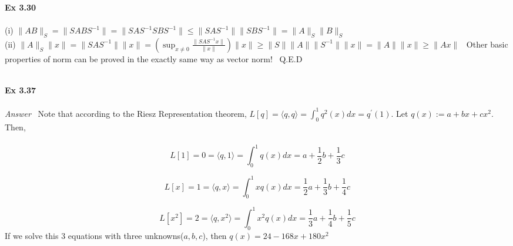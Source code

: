 \documentclass[letterpaper,12pt]{article}
\theoremstyle{definition}
\begin{document}
\begin{spacing}{1.3}{}
	\setlength{\leftskip}{10pt}
	
	\textbf{Ex 3.30} \\\\
	(i) $\|AB\|_S = \|SABS^{-1}\| = \|SAS^{-1} SBS^{-1}\| \leq \|SAS^{-1}\| \|SBS^{-1}\| = \|A\|_S \|B\|_S  $ \\
	(ii) $\|A\|_{S} \|x\| = \|SAS^{-1}\| \|x\| = (\sup_{x \neq 0} \frac{\|SAS^{-1} x\|}{\|x\|}) \|x\| \geq \|S\| \|A\| \|S^{-1}\| \|x\| = \|A\| \|x\| \geq \|Ax\| $ \ Other basic properties of norm can be proved in the exactly same way as vector norm! \ Q.E.D \\\\
	
	
	\setlength{\leftskip}{10pt}
	
	\textbf{Ex 3.37} \\\\
	\emph{Answer} \ Note that according to the Riesz Representation theorem, $L[q] = \langle q,q \rangle = \int_{0}^{1} q^{2}(x)dx = q^{'}(1)$. Let $q(x) := a + bx + c x^2$. Then, \\\\
	\[L[1] = 0 =\langle q,1 \rangle = \int_{0}^{1} q(x)dx = a + \frac{1}{2}b + \frac{1}{3}c \]
	
	\[L[x] = 1 =\langle q,x \rangle = \int_{0}^{1} xq(x)dx = \frac{1}{2}a + \frac{1}{3}b + \frac{1}{4}c \]
	
	\[L[x^2] = 2 =\langle q,x^2 \rangle = \int_{0}^{1} x^2 q(x)dx = \frac{1}{3} a + \frac{1}{4}b + \frac{1}{5}c \]
	If we solve this 3 equations with three unknowns($a,b,c$), then
	$q(x) = 24 - 168x + 180 x^2$ \\\\
	
	\setlength{\leftskip}{10pt}
	

\end{spacing}
\end{document}
